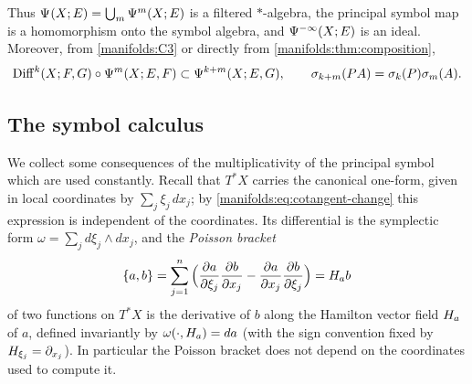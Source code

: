Thus $\Psi^{}(X;E)=\bigcup_m\Psi^{m}(X;E)$ is a filtered $*$-algebra, the
principal symbol map is a homomorphism onto the symbol algebra, and
$\Psi^{-\infty}(X;E)$ is an ideal. Moreover, from \ref{manifolds:C3} or directly
from \cref{manifolds:thm:composition},
\begin{equation*}
\operatorname{Diff}^{k}(X;F,G)\circ\Psi^{m}(X;E,F)\subset\Psi^{k+m}(X;E,G),\qquad
\sigma_{k+m}(PA)=\sigma_k(P)\sigma_m(A).
\end{equation*}

\subsection{The symbol calculus}
We collect some consequences of the multiplicativity of the principal symbol
which are used constantly. Recall that $T^*X$ carries the canonical
one-form, given in local coordinates by $\sum_j\xi_j\,dx_j$; by
\eqref{manifolds:eq:cotangent-change} this expression is independent of the
coordinates. Its differential is the symplectic form
$\omega=\sum_jd\xi_j\wedge dx_j$, and the \emph{Poisson bracket}
\begin{equation*}
\{a,b\}=\sum_{j=1}^n\Big(\frac{\partial a}{\partial\xi_j}\frac{\partial b}{\partial x_j}
-\frac{\partial a}{\partial x_j}\frac{\partial b}{\partial\xi_j}\Big)=H_{a} b
\end{equation*}
of two functions on $T^*X$ is the derivative of $b$ along the Hamilton vector
field $H_{a}$ of $a$, defined invariantly by $\omega(\cdot,H_{a})=da$ (with the
sign convention fixed by $H_{\xi_j}=\partial_{x_j}$). In particular the Poisson
bracket does not depend on the coordinates used to compute it.

